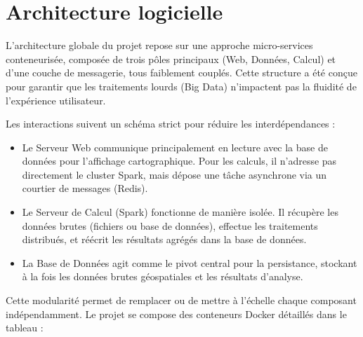 \documentclass[french]{tai_info} %
\begin{document}
\section{Architecture logicielle}

L'architecture globale du projet repose sur une approche micro-services conteneurisée, composée de trois pôles principaux (Web, Données, Calcul) et d'une couche de messagerie, tous faiblement couplés. Cette structure a été conçue pour garantir que les traitements lourds (Big Data) n'impactent pas la fluidité de l'expérience utilisateur.

Les interactions suivent un schéma strict pour réduire les interdépendances :
\begin{itemize}
    \item Le Serveur Web communique principalement en lecture avec la base de données pour l'affichage cartographique. Pour les calculs, il n'adresse pas directement le cluster Spark, mais dépose une tâche asynchrone via un courtier de messages (Redis).
    \item Le Serveur de Calcul (Spark) fonctionne de manière isolée. Il récupère les données brutes (fichiers ou base de données), effectue les traitements distribués, et réécrit les résultats agrégés dans la base de données.
    \item La Base de Données agit comme le pivot central pour la persistance, stockant à la fois les données brutes géospatiales et les résultats d'analyse.
\end{itemize}

Cette modularité permet de remplacer ou de mettre à l'échelle chaque composant indépendamment. Le projet se compose des conteneurs Docker détaillés dans le tableau :

\begin{table}[htbp]
    \centering
    \caption{Services Docker.}
    \label{tab:docker_services_mini}
\end{table}
\end{document}
